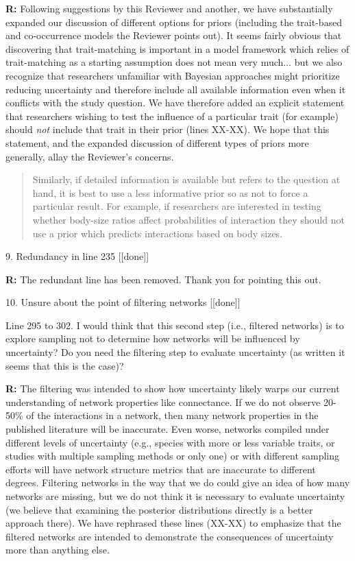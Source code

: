 \documentclass[12pt]{letter}
\newenvironment{refquote}{\bigskip \begin{it}}{\end{it}\smallskip}
\begin{document}
		\textbf{R:} Following suggestions by this Reviewer and another, we have substantially expanded our discussion of different options for priors (including the trait-based and co-occurrence models the Reviewer points out). It seems fairly obvious that discovering that trait-matching is important in a model framework which relies of trait-matching as a starting assumption does not mean very much... but we also recognize that researchers unfamiliar with Bayesian approaches might prioritize reducing uncertainty and therefore include all available information even when it conflicts with the study question. We have therefore added an explicit statement that researchers wishing to test the influence of a particular trait (for example) should \emph{not} include that trait in their prior (lines XX-XX). We hope that this statement, and the expanded discussion of different types of priors more generally, allay the Reviewer's concerns. 

		\begin{quotation}
			Similarly, if detailed information is available but refers to the question at hand, it is best to use a less informative prior so as not to force a particular result. For example, if researchers are interested in testing whether body-size ratios affect probabilities of interaction they should not use a prior which predicts interactions based on body sizes.
		\end{quotation}


	9. Redundancy in line 235 [[done]]

		\textbf{R:} The redundant line has been removed. Thank you for pointing this out.


	10. Unsure about the point of filtering networks [[done]]

		\begin{refquote}
		Line 295 to 302.  I would think that this second step (i.e., filtered networks) is to explore sampling not to determine how networks will be influenced by uncertainty?  Do you need the filtering step to evaluate uncertainty (as written it seems that this is the case)?
		\end{refquote}

		\textbf{R:} The filtering was intended to show how uncertainty likely warps our current understanding of network properties like connectance. If we do not observe 20-50\% of the interactions in a network, then many network properties in the published literature will be inaccurate. Even worse, networks compiled under different levels of uncertainty (e.g., species with more or less variable traits, or studies with multiple sampling methods or only one) or with different sampling efforts will have network structure metrics that are inaccurate to different degrees. Filtering networks in the way that we do could give an idea of how many networks are missing, but we do not think it is necessary to evaluate uncertainty (we believe that examining the posterior distributions directly is a better approach there). We have rephrased these lines (XX-XX) to emphasize that the filtered networks are intended to demonstrate the consequences of uncertainty more than anything else.
\end{document}
